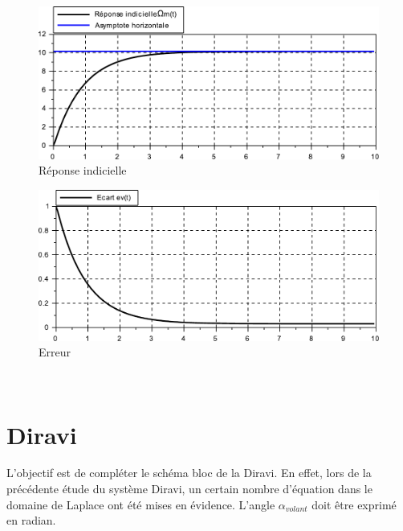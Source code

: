 \begin{figure}[!h]
 \centering\includegraphics[width=0.6\linewidth]{img/motoreduc_courbe1}
 \caption{Réponse indicielle}
 \label{bloc2}
\end{figure}

\begin{figure}[!h]
 \centering\includegraphics[width=0.6\linewidth]{img/motoreduc_courbe2}
 \caption{Erreur}
 \label{bloc3}
\end{figure}

~\

\newpage

\section{Diravi}

L'objectif est de compléter le schéma bloc de la Diravi. En effet, lors de la précédente étude du système Diravi, un certain nombre d'équation dans le domaine de Laplace ont été mises en évidence. L'angle $\alpha_{volant}$ doit être exprimé en radian.

